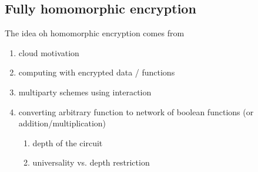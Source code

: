 \documentclass[11pt,oneside,final]{fithesis2}
\begin{document}
% 

    
\subsection{Fully homomorphic encryption}
    




    The idea oh homomorphic encryption comes from 
    

    \begin{enumerate}
     \item cloud motivation
     \item computing with encrypted data / functions
     \item multiparty schemes using interaction
     \item converting arbitrary function to network of boolean functions (or addition/multiplication)
	\begin{enumerate}
	 \item depth of the circuit
	 \item universality vs. depth restriction
	\end{enumerate}
    
%
    

\end{enumerate}
\end{document}

